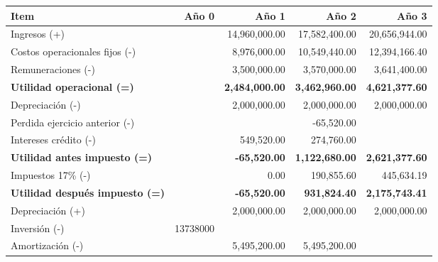 \begin{enumerate}[(a)]
          \begin{table}[h!t]
                \centering
                \footnotesize                
                \begin{tabular}{|l|r|r|r|r|}
                    \hline
                    {\bf Item}                               & {\bf Año 0}   & {\bf Año 1 }  & {\bf Año 2}   & {\bf Año 3}   \\\hline
                    {    Ingresos (+)}                       &               & 14,960,000.00 & 17,582,400.00 & 20,656,944.00 \\\hline
                    {    Costos operacionales fijos (-)}     &               &  8,976,000.00 & 10,549,440.00 & 12,394,166.40 \\\hline
                    {    Remuneraciones (-)}                 &               &  3,500,000.00 &  3,570,000.00 &  3,641,400.00 \\\hline
                    {\bf Utilidad operacional (=)}           &               &{\bf 2,484,000.00} &{\bf 3,462,960.00} &{\bf 4,621,377.60} \\\hline
                    {    Depreciación (-)}                   &               &  2,000,000.00 &  2,000,000.00 &  2,000,000.00 \\\hline
                    {    Perdida ejercicio anterior (-)}     &               &               &    -65,520.00 &               \\\hline
                    {    Intereses crédito (-)}              &               &    549,520.00 &    274,760.00 &               \\\hline
                    {\bf Utilidad antes impuesto (=)}        &               &{\bf-65,520.00}&{\bf 1,122,680.00} &{\bf 2,621,377.60} \\\hline
                    {    Impuestos 17\% (-)}                 &               &          0.00 &    190,855.60 &    445,634.19 \\\hline
                    {\bf Utilidad después impuesto (=)}      &               &{\bf-65,520.00}&{\bf 931,824.40}&{\bf 2,175,743.41} \\\hline
                    {    Depreciación (+)}                   &               &  2,000,000.00 &  2,000,000.00 &  2,000,000.00 \\\hline
                    {    Inversión (-)}                      & 13738000      &               &               &               \\\hline
                    {    Amortización (-)}                   &               &  5,495,200.00 &  5,495,200.00 &               \\\hline

\end{tabular}
\end{table}
\end{enumerate}
